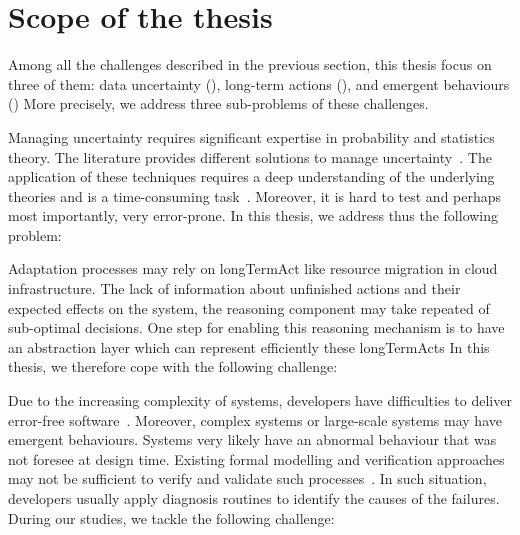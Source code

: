 \section{Scope of the thesis}

Among all the challenges described in the previous section, this thesis focus on three of them: data uncertainty (), long-term actions (), and emergent behaviours ()
More precisely, we address three sub-problems of these challenges.

Managing uncertainty requires significant expertise in probability and statistics theory.
The literature provides different solutions to manage uncertainty~\cite{zadeh1996fuzzy,metrology2008evaluation,shafer1992dempster}.
The application of these techniques requires a deep understanding of the underlying theories and is a time-consuming task~\cite{DBLP:conf/quatic/VallecilloMO16}.
Moreover, it is hard to test and perhaps most importantly, very error-prone.
In this thesis, we address thus the following problem:
\vspace{-2em}

Adaptation processes may rely on \gls{longTermAct} like resource migration in cloud infrastructure.
The lack of information about unfinished actions and their expected effects on the system, the reasoning component may take repeated of sub-optimal decisions.
One step for enabling this reasoning mechanism is to have an abstraction layer which can represent efficiently these \glspl{longTermAct}
In this thesis, we therefore cope with the following challenge:
\vspace{-2em}

Due to the increasing complexity of systems, developers have difficulties to deliver error-free software~\cite{DBLP:conf/icse/BarbosaLMJ17, DBLP:conf/icse/MongielloPS15, DBLP:conf/icse/HassanBB15}.
Moreover, complex systems or large-scale systems may have emergent behaviours.
Systems very likely have an abnormal behaviour that was not foresee at design time.
Existing formal modelling and verification approaches may not be sufficient to verify and validate such processes~\cite{DBLP:conf/icse/TaharaOH17}.
In such situation, developers usually apply diagnosis routines to identify the causes of the failures.
During our studies, we tackle the following challenge:
\vspace{-2em}

